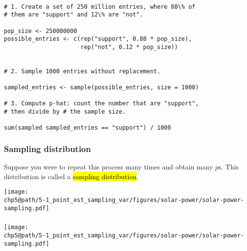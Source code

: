 \begin{frame}[fragile]
\frametitle{}

\begin{beamerboxesrounded}[shadow = true, lower = code body]{}
{
\small 
\begin{verbatim}

# 1. Create a set of 250 million entries, where 88\% of 
# them are "support" and 12\% are "not".

pop_size <- 250000000
possible_entries <- c(rep("support", 0.88 * pop_size), 
                      rep("not", 0.12 * pop_size))


# 2. Sample 1000 entries without replacement.

sampled_entries <- sample(possible_entries, size = 1000)

# 3. Compute p-hat: count the number that are "support", 
# then divide by # the sample size.

sum(sampled sampled_entries == "support") / 1000

\end{verbatim}
}
\end{beamerboxesrounded}

\end{frame}


\begin{frame}
\frametitle{Sampling distribution}

Suppose you were to repeat this process many times and obtain many $\hat{p}$s. This distribution is called a \hl{sampling distribution}.

\begin{center}
\texttt{[image: \\chp5@path/5-1\_point\_est\_sampling\_var/figures/solar-power/solar-power-sampling.pdf]}
\end{center}

\end{frame}


\begin{frame}
\frametitle{}


\begin{center}
\texttt{[image: \\chp5@path/5-1\_point\_est\_sampling\_var/figures/solar-power/solar-power-sampling.pdf]}
\end{center}

$\:$ \\

\end{frame}

